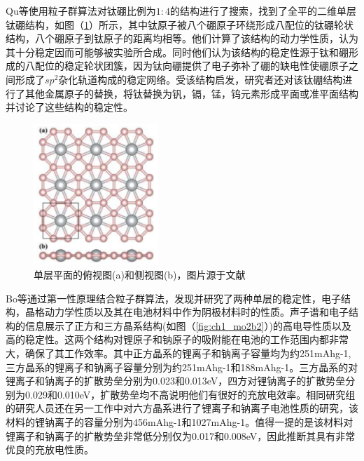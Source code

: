 Qu等\cite{qu2017two}使用粒子群算法对钛硼比例为$1:4$的结构进行了搜索，找到了全平的二维单层钛硼结构，如图（\ref{fig:ch1_tib4}）所示，其中钛原子被八个硼原子环绕形成八配位的钛硼轮状结构，八个硼原子到钛原子的距离均相等。他们计算了该结构的动力学性质，认为其十分稳定因而可能够被实验所合成。同时他们认为该结构的稳定性源于钛和硼形成的八配位的稳定轮状团簇，因为钛向硼提供了电子弥补了硼的缺电性使硼原子之间形成了$sp^2$杂化轨道构成的稳定网络。受该结构启发，研究者还对该钛硼结构进行了其他金属原子的替换，将钛替换为钒，镉，锰，钨元素形成平面或准平面结构并讨论了这些结构的稳定性。

\begin{figure}
  \includegraphics[width=0.42\textwidth]{figs/ch1_tib4.png}
  \centering
  \caption{单层平面的俯视图(a)和侧视图(b)，图片源于文献\cite{qu2017two}}
  \label{fig:ch1_tib4}
\end{figure}

Bo等\cite{bo2019tetragonal}通过第一性原理结合粒子群算法，发现并研究了两种单层的稳定性，电子结构，晶格动力学性质以及其在电池材料中作为阴极材料时的性质。声子谱和电子结构的信息展示了正方和三方晶系结构(如图（\ref{fig:ch1_mo2b2}）)的高电导性质以及高的稳定性。这两个结构对锂原子和钠原子的吸附能在电池的工作范围内都非常大，确保了其工作效率。其中正方晶系的锂离子和钠离子容量均为约251mAhg-1, 三方晶系的锂离子和钠离子容量分别为约251mAhg-1和188mAhg-1。三方晶系的对锂离子和钠离子的扩散势垒分别为0.023和0.013eV，四方对锂钠离子的扩散势垒分别为0.029和0.010eV，扩散势垒均不高说明他们有很好的充放电效率。相同研究组的研究人员还在另一工作中对六方晶系\cite{bo2018hexagonal}进行了锂离子和钠离子电池性质的研究，该材料的锂钠离子的容量分别为456mAhg-1和1027mAhg-1。值得一提的是该材料对锂离子和钠离子的扩散势垒非常低分别仅为0.017和0.008eV，因此推断其具有非常优良的充放电性质。

